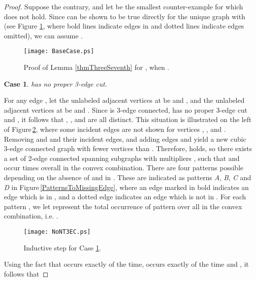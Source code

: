 \documentclass[oneeqnum,final]{siamltex1213}
\newtheorem{case}{Case}
\begin{document}
\begin{proof}
Suppose the contrary, and let  be the smallest counter-example for which  does not hold. Since  can be shown to be true directly for the unique graph  with  (see Figure \ref{BaseCase}, where bold lines indicate edges in  and dotted lines indicate edges omitted), we can assume .

\begin{figure}
\begin{center}
\texttt{[image: BaseCase.ps]}
\end{center}
\caption{Proof of Lemma \ref{thmThreeSeventh} for , when .}
\label{BaseCase}
\end{figure}
\vspace{1em}
\begin{case} \label{LemmaBaseCase}
 has no proper 3-edge cut.
\end{case}
For any edge , let the unlabeled adjacent vertices at  be  and , and the unlabeled adjacent vertices at  be  and . Since  is 3-edge connected, has no proper 3-edge cut and , it follows that , ,  and  are all distinct. This situation is illustrated on the left of Figure\,\ref{NoNonTrivial3EC}, where some incident edges are not shown for vertices , ,  and . Removing  and  and their incident edges, and adding edges  and  yield a new cubic 3-edge connected graph  with fewer vertices than . Therefore,  holds, so there exists a set of \mbox{2-edge} connected spanning subgraphs  with multipliers ,  such that  and  occur  times overall in the convex combination. There are four patterns possible depending on the absence of  and  in . These are indicated as patterns \emph{A}, \emph{B}, \emph{C} and \emph{D} in Figure\,\ref{PatternsToMissingEdge}, where an edge marked in bold indicates an edge which is in , and a dotted edge indicates an edge which is not in . For each pattern , we let  represent the total occurrence of pattern  over all  in the convex combination, i.e. .


\begin{figure}
\begin{center}
\texttt{[image: NoNT3EC.ps]}
\end{center}
\caption{Inductive step for Case \ref{LemmaBaseCase}.}
\label{NoNonTrivial3EC}
\end{figure}

Using the fact that  occurs exactly  of the time,  occurs exactly  of the time and , it follows that



\end{proof}
\end{document}
